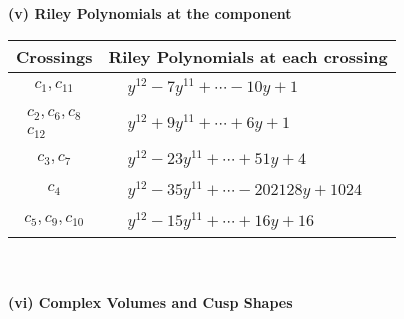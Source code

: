 \documentclass[1p]{elsarticle_modified}
\theoremstyle{definition}
\begin{document}
\newpage\renewcommand{\arraystretch}{1}
\flushleft \textbf{(v) Riley Polynomials at the component}\newline \\
\begin{tabular}{m{50pt}|m{274pt}}
Crossings & \hspace{64pt}Riley Polynomials at each crossing \\
\hline $$\begin{aligned}c_{1},c_{11}\end{aligned}$$&$\begin{aligned}
&y^{12}-7 y^{11}+\cdots-10 y+1
\end{aligned}$\\
\hline $$\begin{aligned}c_{2},c_{6},c_{8}\\c_{12}\end{aligned}$$&$\begin{aligned}
&y^{12}+9 y^{11}+\cdots+6 y+1
\end{aligned}$\\
\hline $$\begin{aligned}c_{3},c_{7}\end{aligned}$$&$\begin{aligned}
&y^{12}-23 y^{11}+\cdots+51 y+4
\end{aligned}$\\
\hline $$\begin{aligned}c_{4}\end{aligned}$$&$\begin{aligned}
&y^{12}-35 y^{11}+\cdots-202128 y+1024
\end{aligned}$\\
\hline $$\begin{aligned}c_{5},c_{9},c_{10}\end{aligned}$$&$\begin{aligned}
&y^{12}-15 y^{11}+\cdots+16 y+16
\end{aligned}$\\
\hline
\end{tabular}\\~\\
\newpage\flushleft \textbf{(vi) Complex Volumes and Cusp Shapes}
\end{document}
